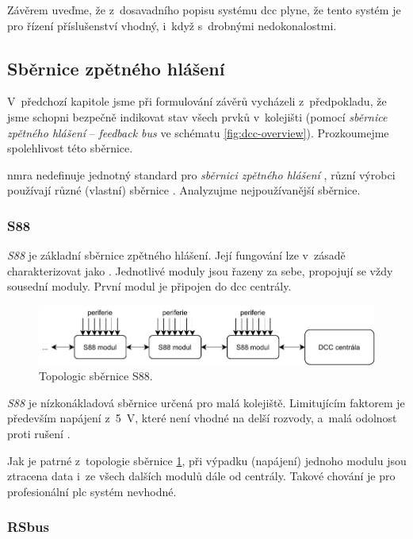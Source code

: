 Závěrem uveďme, že z~dosavadního popisu systému \gls{dcc} plyne, že tento
systém je pro řízení příslušenství vhodný, i~když s~drobnými nedokonalostmi.

\subsection{Sběrnice zpětného hlášení}

V~předchozí kapitole jsme při formulování závěrů vycházeli z~předpokladu, že
jsme schopni bezpečně indikovat stav všech prvků v~kolejišti (pomocí
\textit{sběrnice zpětného hlášení} – \textit{feedback bus} ve schématu
\ref{fig:dcc-overview}). Prozkoumejme spolehlivost této sběrnice.

\gls{nmra} nedefinuje jednotný standard pro \textit{sběrnici zpětného hlášení}
\cite{dcc_specs:web}, různí výrobci používají různé (vlastní) sběrnice
\cite{dcc_feedbacks:web}. Analyzujme nejpoužívanější sběrnice.

\subsubsection{S88}

\textit{S88} je základní sběrnice zpětného hlášení. Její fungování lze v~zásadě
charakterizovat jako  \cite{s88:web}. Jednotlivé
moduly jsou řazeny za sebe, propojují se vždy sousední moduly. První modul je
připojen do \gls{dcc} centrály.

\begin{figure}[ht!]
\includegraphics[width=\textwidth]{data/s88.pdf}
\caption{Topologic sběrnice S88.}
\label{fig:s88-topology}
\end{figure}

\textit{S88} je nízkonákladová sběrnice určená pro malá kolejiště. Limitujícím
faktorem je především napájení z~5~V, které není vhodné na delší rozvody,
a~malá odolnost proti rušení \cite{s88:web}.

Jak je patrné z~topologie sběrnice \ref{fig:s88-topology}, při výpadku
(napájení) jednoho modulu jsou ztracena data i~ze všech dalších modulů dále od
centrály. Takové chování je pro profesionální \gls{plc} systém nevhodné.

\subsubsection{RSbus}

